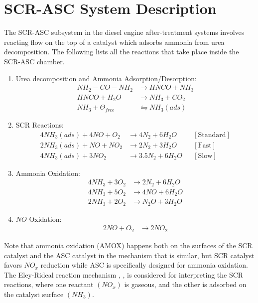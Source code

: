 \section{SCR-ASC System Description}

The SCR-ASC subsystem in the diesel engine after-treatment systems involves reacting flow on the top of a catalyst which adsorbs ammonia from urea decomposition. The following lists all the reactions that take place inside the SCR-ASC chamber.

\begin{enumerate}
    \item Urea decomposition and Ammonia Adsorption/Desorption:
    \begin{align*}
        NH_2 - CO - NH_2 &\longrightarrow  HNCO + NH_3 \\
        HNCO + H_2O &\longrightarrow NH_3 + CO_2 \\
        NH_3 + \Theta_{free} &\leftrightharpoons NH_3(ads)
    \end{align*}

    \item SCR Reactions:
    \begin{align*}
    4 NH_3 (ads) + 4 NO + O_2 &\longrightarrow 4 N_2 + 6 H_2O
                              & &[\text{Standard}]\\
    2 NH_3 (ads) +  NO + N O_2 &\longrightarrow 2 N_2 + 3 H_2O
                              & &[\text{Fast}]\\
    4 NH_3 (ads) + 3N O_2 &\longrightarrow 3.5 N_2 + 6 H_2O
                              & &[\text{Slow}]
    \end{align*}

    \item Ammonia Oxidation:
    \begin{align*}
    4 NH_3 + 3 O_2 &\longrightarrow 2 N_2 + 6 H_2O\\
    4 NH_3 + 5 O_2 &\longrightarrow 4 NO + 6 H_2 O\\
    2 NH_3 + 2 O_2 &\longrightarrow N_2O + 3 H_2O
    \end{align*}

    \item $NO$ Oxidation:
    \begin{align*}
    2 NO + O_2 &\longrightarrow 2 NO_2
    \end{align*}
\end{enumerate}


Note that ammonia oxidation (AMOX) happens both on the surfaces of the SCR catalyst and the ASC catalyst in the
mechanism that is similar, but SCR catalyst favors $NO_x$ reduction while ASC is specifically designed for ammonia
oxidation. The Eley-Rideal reaction mechanism \cite{yuan2015diesel}, \cite{hsieh2011development}, \cite{nova2014urea} is
considered for interpreting the SCR reactions, where one reactant $(NO_x)$ is gaseous, and the other is adsorbed on the
catalyst surface $(NH_3)$.

